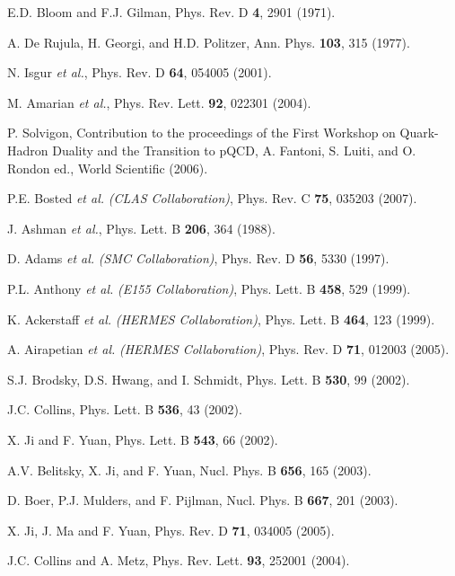 \begin{thebibliography}{199}
E.D. Bloom and F.J. Gilman, Phys. Rev. D {\bf 4}, 2901 (1971).

A. De Rujula, H. Georgi, and H.D. Politzer, Ann. Phys. {\bf 103}, 315 (1977).

N. Isgur {\it et al.}, Phys. Rev. D {\bf 64}, 054005 (2001).

M. Amarian {\it et al.}, Phys. Rev. Lett. {\bf 92}, 022301 (2004).

P. Solvigon, Contribution to the proceedings of the First Workshop on 
Quark-Hadron Duality and the Transition to pQCD, A. Fantoni, S. Luiti, 
and O. Rondon ed., World Scientific (2006).

P.E. Bosted {\it et al.} {\it (CLAS Collaboration)}, Phys. Rev. C {\bf 75},
035203 (2007).

%
%

J. Ashman {\it et al.}, Phys. Lett. B {\bf 206}, 364 (1988).

D. Adams {\it et al.} {\it (SMC Collaboration)}, Phys. Rev. D {\bf 56},
5330 (1997).

P.L. Anthony {\it et al.} {\it (E155 Collaboration)}, Phys. Lett. B {\bf 458},
529 (1999).

K. Ackerstaff {\it et al.} {\it (HERMES Collaboration)}, Phys. Lett. B
{\bf 464}, 123 (1999).

A. Airapetian {\it et al.} {\it (HERMES Collaboration)}, Phys. Rev. D
{\bf 71}, 012003 (2005).

S.J. Brodsky, D.S. Hwang, and I. Schmidt, Phys. Lett. B {\bf 530}, 99
(2002).

J.C. Collins, Phys. Lett. B {\bf 536}, 43 (2002).

X. Ji and F. Yuan, Phys. Lett. B {\bf 543}, 66 (2002).

A.V. Belitsky, X. Ji, and F. Yuan, Nucl. Phys. B {\bf 656}, 165 (2003).

D. Boer, P.J. Mulders, and F. Pijlman, Nucl. Phys. B {\bf 667}, 201 (2003).

X. Ji, J. Ma and F. Yuan, Phys. Rev. D {\bf 71}, 034005 (2005).

J.C. Collins and A. Metz, Phys. Rev. Lett. {\bf 93}, 252001 (2004).


\end{thebibliography}
